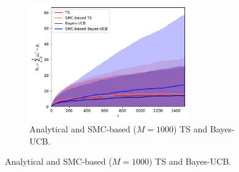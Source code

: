 \begin{figure}[!h]
	\centering
	\begin{subfigure}[b]{\textwidth}
		\centering
		\includegraphics[width=0.75\textwidth]{./fods_figs/static/bernoulli/A2/theta0.5_0.7_M1000_cumulative_regret}
		\caption{Analytical and SMC-based ($M=1000$) TS and Bayes-UCB.}
	\end{subfigure}
	

\end{figure}

